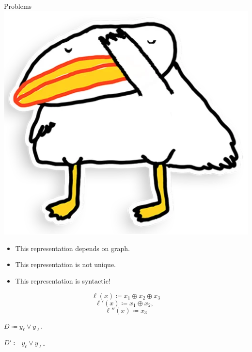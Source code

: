 \begin{frame}{Problems \hspace{0.1cm} \includegraphics[scale = 0.03]{pics/utia-shame.png}}

    \begin{itemize}
        \item This representation depends on graph.
            \pause
        \item This representation is \alert{not} unique.
            \pause
        \item This representation is \alert{syntactic}!
    \end{itemize}
    \pause

    \vspace{0.2cm}
    \begin{minipage}{0.2\linewidth}
        \centering
        
    \end{minipage}
    \begin{minipage}{0.75\linewidth}
        \vspace{-0.2cm}
        $$
        \ell(x) \coloneqq x_1 \oplus x_2 \oplus x_3
        $$
        $$
        \ell'(x) \coloneqq x_1 \oplus x_2, ~~
        $$
        $$
        \ell''(x) \coloneqq x_3
        $$
    \end{minipage}

    \vspace{0.2cm}
    \pause
    \begin{minipage}{0.48\linewidth}
        \centering
        $D \coloneqq y_{\ell} \lor y_{\ell'}$
    \end{minipage}
    \begin{minipage}{0.48\linewidth}
        \centering
        $D' \coloneqq y_{\ell} \lor y_{\ell''}$
    \end{minipage}


\end{frame}
